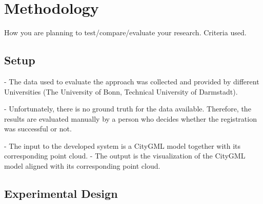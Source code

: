 

    \chapter{Methodology}

    How you are planning to test/compare/evaluate your research.
    Criteria used.

    \section{Setup}
        - The data used to evaluate the approach was collected and provided by different Universities (The University of Bonn, Technical University of Darmstadt). \par
        - Unfortunately, there is no ground truth for the data available. Therefore, the results are evaluated manually by a person who decides whether the registration was successful or not. \par
        - The input to the developed system is a CityGML model together with its corresponding point cloud.
        - The output is the visualization of the CityGML model aligned with its corresponding point cloud.
    \section{Experimental Design}
        

